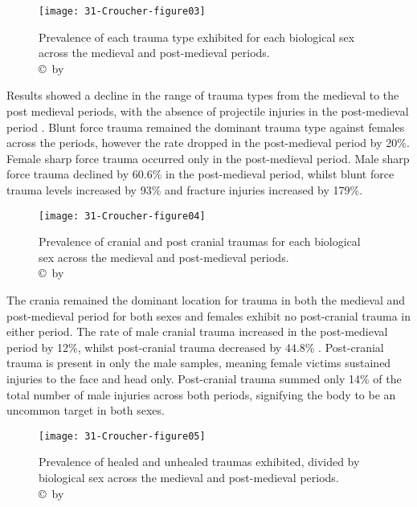 \begin{figure}[!htb]
	\texttt{[image: 31-Croucher-figure03]}
	\caption{Prevalence of each trauma type exhibited for each biological sex across the medieval and post-medieval periods.
		{\normalfont\scriptsize \\ \copyright\ by \shortauthor
	}}
	\label{fig:31-Croucher-figure03}
\end{figure}
 
Results showed a decline in the range of trauma types from the medieval to the post medieval periods, with the absence of projectile injuries in the post-medieval period . 
Blunt force trauma remained the dominant trauma type against females across the periods, however the rate dropped in the post-medieval period by 20\%. Female sharp force trauma occurred only in the post-medieval period. Male sharp force trauma declined by 60.6\% in the post-medieval period, whilst blunt force trauma levels increased by 93\% and fracture injuries increased by 179\%. 
 
\begin{figure}[!htb]
	\texttt{[image: 31-Croucher-figure04]}
	\caption{Prevalence of cranial and post cranial traumas for each biological sex across the medieval and post-medieval periods.
		{\normalfont\scriptsize \\ \copyright\ by \shortauthor
	}}
	\label{fig:31-Croucher-figure04}
\end{figure}

The crania remained the dominant location for trauma in both the medieval and post-medieval period for both sexes and females exhibit no post-cranial trauma in either period. The rate of male cranial trauma increased in the post-medieval period by 12\%, whilst post-cranial trauma decreased by 44.8\% . 
Post-cranial trauma is present in only the male samples, meaning female victims sustained injuries to the face and head only. Post-cranial trauma summed only 14\% of the total number of male injuries across both periods, signifying the body to be an uncommon target in both sexes. 

\begin{figure}[!htb]
	\texttt{[image: 31-Croucher-figure05]}
	\caption{Prevalence of healed and unhealed traumas exhibited, divided by biological sex across the medieval and post-medieval periods.
		{\normalfont\scriptsize \\ \copyright\ by \shortauthor
	}}
	\label{fig:31-Croucher-figure05}
\end{figure}

